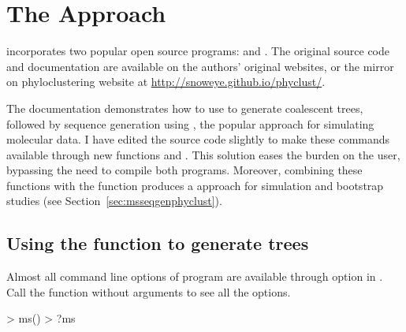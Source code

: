 \section[The ms+seqgen Approach]{The  Approach}
\label{sec:msseqgen}

 incorporates two popular open source  programs:
 \citep{Hudson2002} and  \citep{Rambaut1997}.
The original source code and documentation are available on the authors'
original websites, or the mirror on phyloclustering website at
\url{http://snoweye.github.io/phyclust/}.

The  documentation demonstrates how to use 
to generate coalescent trees, followed by sequence generation using ,
the popular  approach for simulating molecular data.
I have edited the source code slightly to make these commands available through new  functions  and .
This solution eases the burden on the user, bypassing the need to compile both programs.
Moreover, combining these functions with the  function produces a
 approach 
 for simulation and bootstrap studies (see Section~\ref{sec:msseqgenphyclust}).




\subsection[Using the ms() function to generate trees]{Using the  function to generate trees}
\label{sec:ms}

Almost all command line options of program  are available
through option  in .
Call the function without arguments to see all the options.
\begin{Code}
> ms()
> ?ms
\end{Code}

